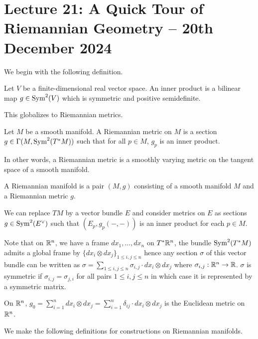 \section{Lecture 21: A Quick Tour of Riemannian Geometry -- 20th December 2024}\label{sec: lecture 21}
We begin with the following definition.
\begin{definition}\label{def: inner product}
    Let $V$ be a finite-dimensional real vector space. An inner product is a bilinear map $g\in\mathrm{Sym}^{2}(V)$ which is symmetric and positive semidefinite. 
\end{definition}
This globalizes to Riemannian metrics. 
\begin{definition}\label{def: Riemannian metric}
    Let $M$ be a smooth manifold. A Riemannian metric on $M$ is a section $g\in\Gamma(M,\mathrm{Sym}^{2}(T^{*}M))$ such that for all $p\in M$, $g_{p}$ is an inner product. 
\end{definition}
In other words, a Riemannian metric is a smoothly varying metric on the tangent space of a smooth manifold. 
\begin{definition}\label{def: Riemannian manifold}
    A Riemannian manifold is a pair $(M,g)$ consisting of a smooth manifold $M$ and a Riemannian metric $g$. 
\end{definition}
\begin{remark}
    We can replace $TM$ by a vector bundle $E$ and consider metrics on $E$ as sections $g\in\mathrm{Sym}^{2}(E^{\vee})$ such that $(E_{p},g_{p}(-,-))$ is an inner product for each $p\in M$. 
\end{remark}
Note that on $\mathbb{R}^{n}$, we have a frame $dx_{1},\dots,dx_{n}$ on $T^{*}\mathbb{R}^{n}$, the bundle $\mathrm{Sym}^{2}(T^{*}M)$ admits a global frame by $\{dx_{i}\otimes dx_{j}\}_{1\leq i,j\leq n}$ hence any section $\sigma$ of this vector bundle can be written as $\sigma=\sum_{1\leq i,j\leq n}\sigma_{i,j}\cdot dx_{i}\otimes dx_{j}$ where $\sigma_{i,j}:\mathbb{R}^{n}\to\mathbb{R}$. $\sigma$ is symmetric if $\sigma_{i,j}=\sigma_{j,i}$ for all pairs $1\leq i,j\leq n$ in which case it is represented by a symmetric matrix. 
\begin{example}\label{ex: Euclidean metric on Rn}
    On $\mathbb{R}^{n}$, $g_{0}=\sum_{i=1}^{n}dx_{i}\otimes dx_{j}=\sum_{i=1}^{n}\delta_{ij}\cdot dx_{i}\otimes dx_{j}$ is the Euclidean metric on $\mathbb{R}^{n}$. 
\end{example}
We make the following definitions for constructions on Riemannian manifolds. 
